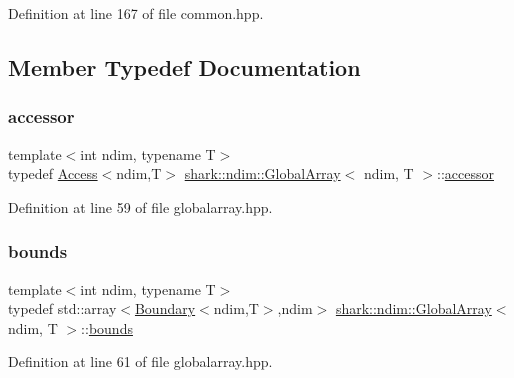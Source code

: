 Definition at line 167 of file common.\+hpp.



\subsection{Member Typedef Documentation}
\hypertarget{classshark_1_1ndim_1_1_global_array_ac19db430fee866f14a2d8f64aabec734}{}\label{classshark_1_1ndim_1_1_global_array_ac19db430fee866f14a2d8f64aabec734} 
\subsubsection{\texorpdfstring{accessor}{accessor}}
{\footnotesize\ttfamily template$<$int ndim, typename T$>$ \\
typedef \hyperlink{classshark_1_1ndim_1_1_access}{Access}$<$ndim,T$>$ \hyperlink{classshark_1_1ndim_1_1_global_array}{shark\+::ndim\+::\+Global\+Array}$<$ ndim, T $>$\+::\hyperlink{classshark_1_1ndim_1_1_global_array_ac19db430fee866f14a2d8f64aabec734}{accessor}}



Definition at line 59 of file globalarray.\+hpp.

\hypertarget{classshark_1_1ndim_1_1_global_array_a5376df376a8de6a0a756def884c55864}{}\label{classshark_1_1ndim_1_1_global_array_a5376df376a8de6a0a756def884c55864} 
\subsubsection{\texorpdfstring{bounds}{bounds}}
{\footnotesize\ttfamily template$<$int ndim, typename T$>$ \\
typedef std\+::array$<$\hyperlink{classshark_1_1ndim_1_1_boundary}{Boundary}$<$ndim,T$>$,ndim$>$ \hyperlink{classshark_1_1ndim_1_1_global_array}{shark\+::ndim\+::\+Global\+Array}$<$ ndim, T $>$\+::\hyperlink{classshark_1_1ndim_1_1_global_array_a5376df376a8de6a0a756def884c55864}{bounds}}



Definition at line 61 of file globalarray.\+hpp.

\hypertarget{classshark_1_1ndim_1_1_global_array_a776d645cf4cd4ca129af3b082d139936}{}\label{classshark_1_1ndim_1_1_global_array_a776d645cf4cd4ca129af3b082d139936} 
